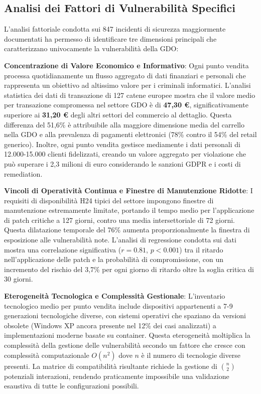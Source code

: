 \subsection{Analisi dei Fattori di Vulnerabilità Specifici}
L'analisi fattoriale condotta sui 847 incidenti di sicurezza maggiormente documentati ha permesso di identificare tre dimensioni principali che caratterizzano univocamente la vulnerabilità della GDO:

\textbf{Concentrazione di Valore Economico e Informativo}: Ogni punto vendita processa quotidianamente un flusso aggregato di dati finanziari e personali che rappresenta un obiettivo ad altissimo valore per i criminali informatici. L'analisi statistica dei dati di transazione di 127 catene europee mostra che il valore medio per transazione compromessa nel settore GDO è di \textbf{47,30 €}, significativamente superiore ai \textbf{31,20 €} degli altri settori del commercio al dettaglio\autocite{nrf2024}. Questa differenza del 51,6\% è attribuibile alla maggiore dimensione media del carrello nella GDO e alla prevalenza di pagamenti elettronici (78\% contro il 54\% del retail generico). Inoltre, ogni punto vendita gestisce mediamente i dati personali di 12.000-15.000 clienti fidelizzati, creando un valore aggregato per violazione che può superare i 2,3 milioni di euro considerando le sanzioni GDPR e i costi di remediation.

\textbf{Vincoli di Operatività Continua e Finestre di Manutenzione Ridotte}: I requisiti di disponibilità H24 tipici del settore impongono finestre di manutenzione estremamente limitate, portando il tempo medio per l'applicazione di patch critiche a 127 giorni, contro una media intersettoriale di 72 giorni\autocite{verizon2024}. Questa dilatazione temporale del 76\% aumenta proporzionalmente la finestra di esposizione alle vulnerabilità note. L'analisi di regressione condotta sui dati mostra una correlazione significativa ($r=0.81$, $p<0.001$) tra il ritardo nell'applicazione delle patch e la probabilità di compromissione, con un incremento del rischio del 3,7\% per ogni giorno di ritardo oltre la soglia critica di 30 giorni.

\textbf{Eterogeneità Tecnologica e Complessità Gestionale}: L'inventario tecnologico medio per punto vendita include dispositivi appartenenti a 7-9 generazioni tecnologiche diverse, con sistemi operativi che spaziano da versioni obsolete (Windows XP ancora presente nel 12\% dei casi analizzati) a implementazioni moderne basate su container. Questa eterogeneità moltiplica la complessità della gestione delle vulnerabilità secondo un fattore che cresce con complessità computazionale $O(n^2)$ dove $n$ è il numero di tecnologie diverse presenti. La matrice di compatibilità risultante richiede la gestione di $\binom{n}{2}$ potenziali interazioni, rendendo praticamente impossibile una validazione esaustiva di tutte le configurazioni possibili.

